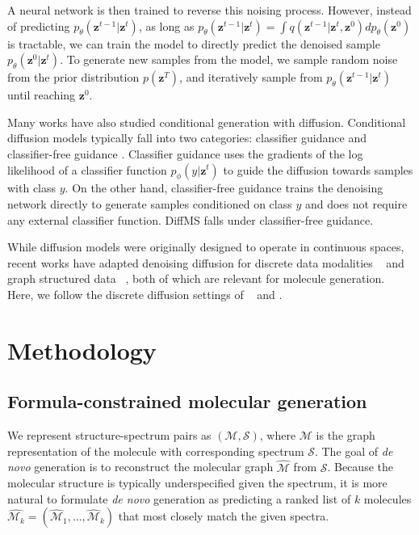 \documentclass{article}
\theoremstyle{plain}
\theoremstyle{definition}
\theoremstyle{remark}
\newcommand{\ours}{DiffMS\xspace}
\begin{document}
A neural network is then trained to reverse this noising process. However, instead of predicting $p_{\theta}(\bm{z}^{t-1} | \bm{z}^t)$, as long as $p_{\theta}(\bm{z}^{t-1} | \bm{z}^t) = \int q(\bm{z}^{t-1} | \bm{z}^t, \bm{z}^0)dp_{\theta}(\bm{z}^0)$ is tractable, we can train the model to directly predict the denoised sample $p_{\theta}(\bm{z}^0 | \bm{z}^t)$. To generate new samples from the model, we sample random noise from the prior distribution $p(\bm{z}^T)$, and iteratively sample from $p_{\theta}(\bm{z}^{t-1} | \bm{z}^t)$ until reaching $\bm{z}^0$.

Many works have also studied conditional generation with diffusion. Conditional diffusion models typically fall into two categories: classifier guidance \citep{dhariwal2021diffusion} and classifier-free guidance \citep{ho2022classifier}. Classifier guidance uses the gradients of the log likelihood of a classifier function $p_{\phi}(y | \bm{z}^t)$ to guide the diffusion towards samples with class $y$. On the other hand, classifier-free guidance trains the denoising network directly to generate samples conditioned on class $y$ and does not require any external classifier function. \ours falls under classifier-free guidance.   

While diffusion models were originally designed to operate in continuous spaces, recent works have adapted denoising diffusion for discrete data modalities ~\citep{austin2023structureddenoisingdiffusionmodels, lou2024discretediffusionmodelingestimating} and graph structured data ~\citep{vignac2023digress, chen2023efficientdegreeguidedgraphgeneration}, both of which are relevant for molecule generation. Here, we follow the discrete diffusion settings of ~\citet{austin2023structureddenoisingdiffusionmodels} and \citet{vignac2023digress}.

\section{Methodology}

\subsection{Formula-constrained molecular generation}


We represent structure-spectrum pairs as $\left(\mathcal{M}, \mathcal{S}\right)$, where $\mathcal{M}$ is the graph representation of the molecule with corresponding spectrum $\mathcal{S}$. The goal of \textit{de novo} generation is to reconstruct the molecular graph $\widehat{\mathcal{M}}$ from $\mathcal{S}$. Because the molecular structure is typically underspecified given the spectrum, it is more natural to formulate \textit{de novo} generation as predicting a ranked list of $k$ molecules $\widehat{\bm{\mathcal{M}}_k} = (\widehat{\mathcal{M}}_1, \dots, \widehat{\mathcal{M}}_k)$ that most closely match the given spectra.
\end{document}
